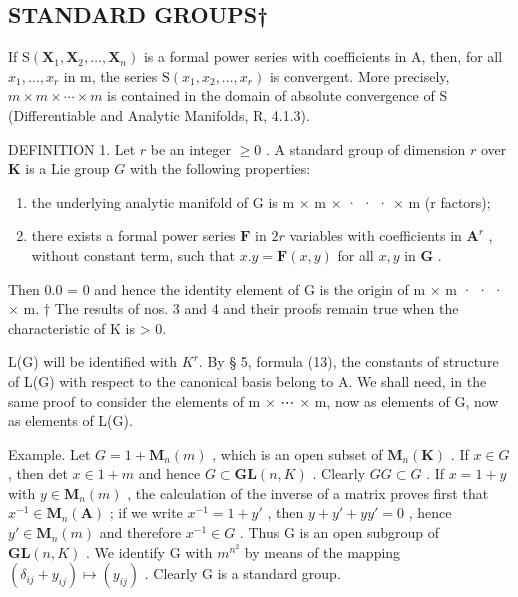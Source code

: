 \subsection{STANDARD GROUPS†}

If \(\mathrm{S}(\mathbf{X}_{1},\mathbf{X}_{2},\ldots,\mathbf{X}_{n})\) is a formal power series with coefficients in A, then, for all \(x_{1},\ldots,x_{r}\) in m, the series \(\mathrm{S}(x_{1},x_{2},\ldots,x_{r})\) is convergent. More precisely, \(m\times m\times\cdots\times m\) is contained in the domain of absolute convergence of S (Differentiable and Analytic Manifolds, R, 4.1.3).

DEFINITION 1. Let \(r\) be an integer \(\geqslant 0\) . A standard group of dimension \(r\) over \(\mathbf{K}\) is a Lie group \(G\) with the following properties:

\begin{enumerate}
\def\labelenumi{(\roman{enumi})}
\item
  the underlying analytic manifold of G is m × m × · · · × m (r factors);
\item
  there exists a formal power series \(\mathbf{F}\) in \(2r\) variables with coefficients in \(\mathbf{A}^r\) , without constant term, such that \(x.y = \mathbf{F}(x,y)\) for all \(x,y\) in \(\mathbf{G}\) .
\end{enumerate}

Then 0.0 = 0 and hence the identity element of G is the origin of m × m · · · × m.
† The results of nos. 3 and 4 and their proofs remain true when the characteristic of K is > 0.

L(G) will be identified with \(K^r\). By § 5, formula (13), the constants of structure of L(G) with respect to the canonical basis belong to A. We shall need, in the same proof to consider the elements of m × ⋯ × m, now as elements of G, now as elements of L(G).

Example. Let \(G = 1 + \mathbf{M}_{n}(m)\) , which is an open subset of \(\mathbf{M}_{n}(\mathbf{K})\) . If \(x \in G\) , then det \(x \in 1 + m\) and hence \(G \subset \mathbf{GL}(n, K)\) . Clearly \(GG \subset G\) . If \(x = 1 + y\) with \(y \in \mathbf{M}_{n}(m)\) , the calculation of the inverse of a matrix proves first that \(x^{-1} \in \mathbf{M}_{n}(\mathbf{A})\) ; if we write \(x^{-1} = 1 + y'\) , then \(y + y' + yy' = 0\) , hence \(y' \in \mathbf{M}_{n}(m)\) and therefore \(x^{-1} \in G\) . Thus G is an open subgroup of \(\mathbf{GL}(n, K)\) . We identify G with \(m^{n^2}\) by means of the mapping \((\delta_{ij} + y_{ij}) \mapsto (y_{ij})\) . Clearly G is a standard group.


